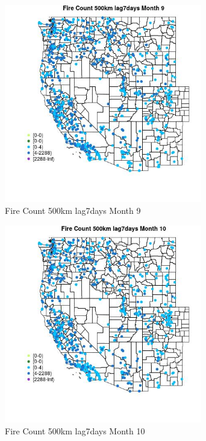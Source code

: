 \begin{figure} 
\centering  
\includegraphics[width=0.77\textwidth]{Code_Outputs/Report_ML_input_PM25_Step4_part_e_de_duplicated_aves_compiled_2019-05-21wNAs_MapObsMo9Fire_Count_500km_lag7days.jpg} 
\caption{\label{fig:Report_ML_input_PM25_Step4_part_e_de_duplicated_aves_compiled_2019-05-21wNAsMapObsMo9Fire_Count_500km_lag7days}Fire Count 500km lag7days Month 9} 
\end{figure} 
 

\begin{figure} 
\centering  
\includegraphics[width=0.77\textwidth]{Code_Outputs/Report_ML_input_PM25_Step4_part_e_de_duplicated_aves_compiled_2019-05-21wNAs_MapObsMo10Fire_Count_500km_lag7days.jpg} 
\caption{\label{fig:Report_ML_input_PM25_Step4_part_e_de_duplicated_aves_compiled_2019-05-21wNAsMapObsMo10Fire_Count_500km_lag7days}Fire Count 500km lag7days Month 10} 
\end{figure} 
 

